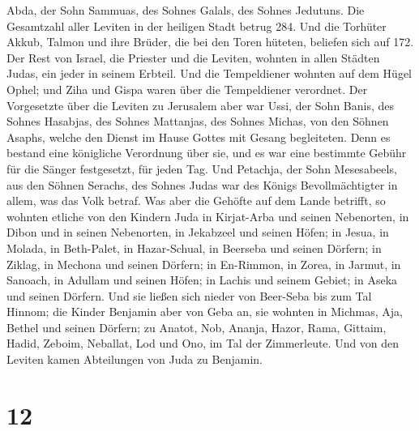 Abda, der Sohn Sammuas, des Sohnes Galals, des Sohnes Jedutuns.
 Die Gesamtzahl aller Leviten in der heiligen Stadt
betrug 284.  Und die Torhüter Akkub, Talmon und ihre
Brüder, die bei den Toren hüteten, beliefen sich auf 172.
 Der Rest von Israel, die Priester und die Leviten,
wohnten in allen Städten Judas, ein jeder in seinem Erbteil.
 Und die Tempeldiener wohnten auf dem Hügel Ophel; und
Ziha und Gispa waren über die Tempeldiener verordnet. 
Der Vorgesetzte über die Leviten zu Jerusalem aber war Ussi, der Sohn
Banis, des Sohnes Hasabjas, des Sohnes Mattanjas, des Sohnes Michas, von
den Söhnen Asaphs, welche den Dienst im Hause Gottes mit Gesang
begleiteten.  Denn es bestand eine königliche Verordnung
über sie, und es war eine bestimmte Gebühr für die Sänger festgesetzt,
für jeden Tag.  Und Petachja, der Sohn Mesesabeels, aus
den Söhnen Serachs, des Sohnes Judas war des Königs Bevollmächtigter in
allem, was das Volk betraf.  Was aber die Gehöfte auf dem
Lande betrifft, so wohnten etliche von den Kindern Juda in Kirjat-Arba
und seinen Nebenorten, in Dibon und in seinen Nebenorten, in Jekabzeel
und seinen Höfen;  in Jesua, in Molada, in Beth-Palet,
 in Hazar-Schual, in Beerseba und seinen Dörfern;
 in Ziklag, in Mechona und seinen Dörfern;
 in En-Rimmon, in Zorea,  in Jarmut, in
Sanoach, in Adullam und seinen Höfen; in Lachis und seinem Gebiet; in
Aseka und seinen Dörfern. Und sie ließen sich nieder von Beer-Seba bis
zum Tal Hinnom;  die Kinder Benjamin aber von Geba an,
sie wohnten in Michmas, Aja, Bethel und seinen Dörfern; 
zu Anatot, Nob, Ananja,  Hazor, Rama, Gittaim,
 Hadid, Zeboim,  Neballat, Lod und Ono, im
Tal der Zimmerleute.  Und von den Leviten kamen
Abteilungen von Juda zu Benjamin.

\hypertarget{section-11}{%
\section{12}\label{section-11}}

